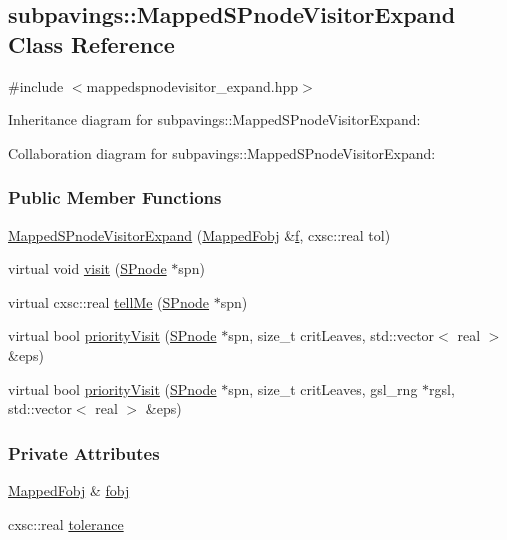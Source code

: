 \hypertarget{classsubpavings_1_1MappedSPnodeVisitorExpand}{\subsection{subpavings\-:\-:\-Mapped\-S\-Pnode\-Visitor\-Expand \-Class \-Reference}
\label{classsubpavings_1_1MappedSPnodeVisitorExpand}
}


{\ttfamily \#include $<$mappedspnodevisitor\-\_\-expand.\-hpp$>$}



\-Inheritance diagram for subpavings\-:\-:\-Mapped\-S\-Pnode\-Visitor\-Expand\-:


\-Collaboration diagram for subpavings\-:\-:\-Mapped\-S\-Pnode\-Visitor\-Expand\-:
\subsubsection*{\-Public \-Member \-Functions}
\begin{DoxyCompactItemize}
\item 
\hyperlink{classsubpavings_1_1MappedSPnodeVisitorExpand_a292481207d6456275fe92160dbcd82b0}{\-Mapped\-S\-Pnode\-Visitor\-Expand} (\hyperlink{classsubpavings_1_1MappedFobj}{\-Mapped\-Fobj} \&\hyperlink{errorfunc_8hpp_aacb77b1211a6ca2e2beff1811cf9ecf4}{f}, cxsc\-::real tol)
\item 
virtual void \hyperlink{classsubpavings_1_1MappedSPnodeVisitorExpand_a9ca7e3ae700e79bd8656757cba68fd55}{visit} (\hyperlink{classsubpavings_1_1SPnode}{\-S\-Pnode} $\ast$spn)
\item 
virtual cxsc\-::real \hyperlink{classsubpavings_1_1MappedSPnodeVisitorExpand_aeed5572a50b11c5f5d49321093188eec}{tell\-Me} (\hyperlink{classsubpavings_1_1SPnode}{\-S\-Pnode} $\ast$spn)
\item 
virtual bool \hyperlink{classsubpavings_1_1MappedSPnodeVisitorExpand_a33088d8b066f447fe2626680a2255ec6}{priority\-Visit} (\hyperlink{classsubpavings_1_1SPnode}{\-S\-Pnode} $\ast$spn, size\-\_\-t crit\-Leaves, std\-::vector$<$ real $>$ \&eps)
\item 
virtual bool \hyperlink{classsubpavings_1_1MappedSPnodeVisitorExpand_ad1b71939066cfd6cda106d03b3ed466e}{priority\-Visit} (\hyperlink{classsubpavings_1_1SPnode}{\-S\-Pnode} $\ast$spn, size\-\_\-t crit\-Leaves, gsl\-\_\-rng $\ast$rgsl, std\-::vector$<$ real $>$ \&eps)
\end{DoxyCompactItemize}
\subsubsection*{\-Private \-Attributes}
\begin{DoxyCompactItemize}
\item 
\hyperlink{classsubpavings_1_1MappedFobj}{\-Mapped\-Fobj} \& \hyperlink{classsubpavings_1_1MappedSPnodeVisitorExpand_a7c071f0df7b4dd7fd009827da8853d35}{fobj}
\item 
cxsc\-::real \hyperlink{classsubpavings_1_1MappedSPnodeVisitorExpand_a77345ab08c67ee3b152e7f48795e1132}{tolerance}
\end{DoxyCompactItemize}


